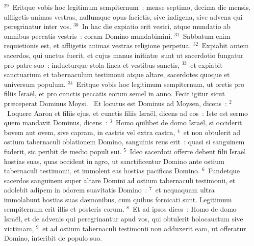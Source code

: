${}^{29}$~Eritque vobis hoc legitimum sempiternum~: mense septimo, decima die mensis, affligetis animas vestras, nullumque opus facietis, sive indigena, sive advena qui peregrinatur inter vos.
${}^{30}$~In hac die expiatio erit vestri, atque mundatio ab omnibus peccatis vestris~: coram Domino mundabimini.
${}^{31}$~Sabbatum enim requietionis est, et affligetis animas vestras religione perpetua.
${}^{32}$~Expiabit autem sacerdos, qui unctus fuerit, et cujus manus initiat\ae\ sunt ut sacerdotio fungatur pro patre suo~: indueturque stola linea et vestibus sanctis,
${}^{33}$~et expiabit sanctuarium et tabernaculum testimonii atque altare, sacerdotes quoque et universum populum.
${}^{34}$~Eritque vobis hoc legitimum sempiternum, ut oretis pro filiis Isra\"el, et pro cunctis peccatis eorum semel in anno. Fecit igitur sicut pr\ae ceperat Dominus Moysi.
~\lettrine[lines=10,image=true,loversize=0.05,lraise=-0.03]{E}{}t locutus est Dominus ad Moysen, dicens~:
${}^{2}$~Loquere Aaron et filiis ejus, et cunctis filiis Isra\"el, dicens ad eos~: Iste est sermo quem mandavit Dominus, dicens~:
${}^{3}$~Homo quilibet de domo Isra\"el, si occiderit bovem aut ovem, sive capram, in castris vel extra castra,
${}^{4}$~et non obtulerit ad ostium tabernaculi oblationem Domino, sanguinis reus erit~: quasi si sanguinem fuderit, sic peribit de medio populi sui.
${}^{5}$~Ideo sacerdoti offerre debent filii Isra\"el hostias suas, quas occident in agro, ut sanctificentur Domino ante ostium tabernaculi testimonii, et immolent eas hostias pacificas Domino.
${}^{6}$~Fundetque sacerdos sanguinem super altare Domini ad ostium tabernaculi testimonii, et adolebit adipem in odorem suavitatis Domino~:
${}^{7}$~et nequaquam ultra immolabunt hostias suas d\ae monibus, cum quibus fornicati sunt. Legitimum sempiternum erit illis et posteris eorum.
${}^{8}$~Et ad ipsos dices~: Homo de domo Isra\"el, et de advenis qui peregrinantur apud vos, qui obtulerit holocaustum sive victimam,
${}^{9}$~et ad ostium tabernaculi testimonii non adduxerit eam, ut offeratur Domino, interibit de populo suo.


